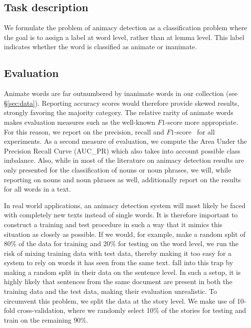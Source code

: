 \documentclass[a4paper,UKenglish]{oasics}
\begin{document}
\subsection{Task description}

We formulate the problem of animacy detection as a classification
problem where the goal is to assign a label at word level, rather than
at lemma level. This label indicates whether the word is classified as
animate or inanimate.

\subsection{Evaluation}

Animate words are far outnumbered by inanimate words in our collection
(see \S\ref{sec:data}). Reporting accuracy scores would therefore
provide skewed results, strongly favoring the majority category. The
relative rarity of animate words makes evaluation measures such as the
well-known $F1$-score more appropriate. For this reason, we report
on the precision, recall and $F1$-score~\cite{rijsbergen:79} for all experiments. As a
second measure of evaluation, we compute the Area Under the Precision
Recall Curve (AUC_{PR}) which also takes into account possible class
imbalance. Also, while in most of the literature on animacy detection
results are only presented for the classification of nouns or noun
phrases, we will, while reporting on nouns and noun phrases as well, additionally report on the
results for all words in a text.

In real world applications, an animacy detection system will most
likely be faced with completely new texts instead of single words. It
is therefore important to construct a training and test procedure in
such a way that it mimics this situation as closely as possible. If we
would, for example, make a random split of 80\% of the data for
training and 20\% for testing on the word level, we run the risk of
mixing training data with test data, thereby making it too easy for a
system to rely on words it has seen from the same
text. \cite{bowman:12} fall into this trap by making a random split in
their data on the sentence level. In such a setup, it is highly likely
that sentences from the same document are present in both the training
data and the test data, making their evaluation unrealistic. To
circumvent this problem, we split the data at the story level. We make
use of 10-fold cross-validation, where we randomly select 10\% of the
stories for testing and train on the remaining 90\%.
\end{document}
